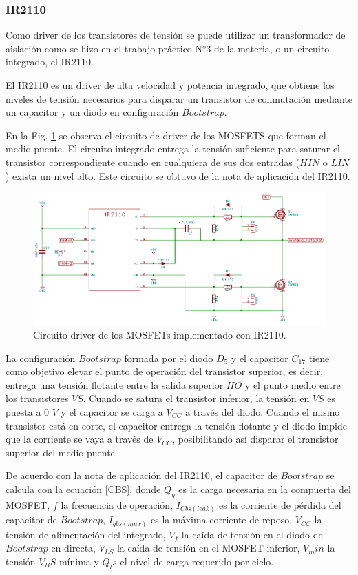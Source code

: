 \documentclass[11pt, a4paper]{article}
\begin{document}
\subsubsection{IR2110}
Como driver de los transistores de tensión se puede utilizar un transformador de aislación como se hizo en el trabajo práctico N°3 de la materia, o un circuito integrado, el IR2110.

El IR2110 es un driver de alta velocidad y potencia integrado, que obtiene los niveles de tensión necesarios para disparar un transistor de conmutación mediante un capacitor y un diodo en configuración $Bootstrap$. 

En la Fig. \ref{driver} se observa el circuito de driver de los MOSFETS que forman el medio puente. El circuito integrado entrega la tensión suficiente para saturar el transistor correspondiente cuando en cualquiera de sus dos entradas ($HIN$ o $LIN$) exista un nivel alto. Este circuito se obtuvo de la nota de aplicación del IR2110.

\begin{figure}[h]
	\centering
	\includegraphics[width = 12 cm]{Imagenes/driver}
	\caption{Circuito driver de los MOSFETs implementado con IR2110.}
	\label{driver}
\end{figure}

La configuración $Bootstrap$ formada por el diodo $D_5$ y el capacitor $C_{17}$ tiene como objetivo elevar el punto de operación del transistor superior, es decir, entrega una tensión flotante entre la salida superior $HO$ y el punto medio entre los transistores $VS$. Cuando se satura el transistor inferior, la tensión en $VS$ es puesta a $0$ $V$ y el capacitor se carga a $V_{CC}$ a través del diodo. Cuando el mismo transistor está en corte, el capacitor entrega la tensión flotante y el diodo impide que la corriente se vaya a través de $V_{CC}$, posibilitando así disparar el transistor superior del medio puente.

De acuerdo con la nota de aplicación del IR2110, el capacitor de $Bootstrap$ se calcula con la ecuación \ref{CBS}, donde $Q_g$ es la carga necesaria en la compuerta del MOSFET, $f$ la frecuencia de operación, $I_{Cbs(leak)}$  es la corriente de pérdida del capacitor de $Bootstrap$, $I_{qbs(max)}$ es la máxima corriente de reposo, $V_{CC}$ la tensión de alimentación del integrado, $V_f$ la caída de tensión en el diodo de $Bootstrap$ en directa, $V_{LS}$ la caída de tensión en el MOSFET inferior, $V_min$ la tensión $V_BS$ mínima y $Q_ls$ el nivel de carga requerido por ciclo.
\end{document}
